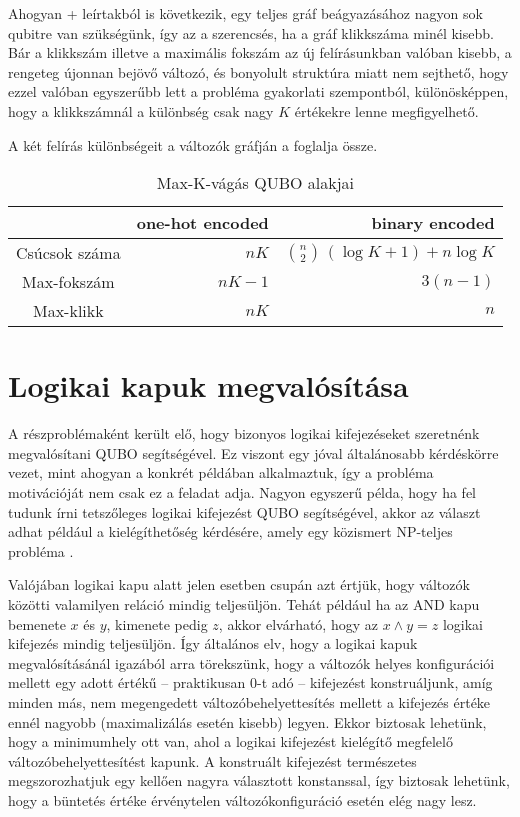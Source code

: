 Ahogyan \az+ leírtakból is következik, egy teljes gráf beágyazásához nagyon sok qubitre van szükségünk, így az a szerencsés, ha a gráf klikkszáma minél kisebb. Bár a klikkszám illetve a maximális fokszám az új felírásunkban valóban kisebb, a rengeteg újonnan bejövő változó, és bonyolult struktúra miatt nem sejthető, hogy ezzel valóban egyszerűbb lett a probléma gyakorlati szempontból, különösképpen, hogy a klikkszámnál a különbség csak nagy $K$ értékekre lenne megfigyelhető.

A két felírás különbségeit a változók gráfján a  foglalja össze.


\begin{table}[ht]
	\footnotesize
	\centering
	\begin{tabular}{ c r r }
		\toprule
		  & one-hot encoded & binary encoded \\
		\midrule
		Csúcsok száma  & $n K$     & $\binom{n}{2} \, ( \log K + 1 ) + n \log K$ \\
		Max-fokszám    & $n K - 1 $ & $3(n-1)$ \\
		Max-klikk      & $n K$     & $n$ \\		
		\bottomrule
	\end{tabular}
	\caption{Max-K-vágás QUBO alakjai}
	\label{tab:diffMaxKCutFormulas}
\end{table}  

\section{Logikai kapuk megvalósítása}\label{sec:theoryLogicalGates}

A  részproblémaként került elő, hogy bizonyos logikai kifejezéseket szeretnénk megvalósítani QUBO segítségével. Ez viszont egy jóval általánosabb kérdéskörre vezet, mint ahogyan a konkrét példában alkalmaztuk, így a probléma motivációját nem csak ez a feladat adja. Nagyon egyszerű példa, hogy ha fel tudunk írni tetszőleges logikai kifejezést QUBO segítségével, akkor az választ adhat például a kielégíthetőség kérdésére, amely egy közismert NP-teljes probléma \cite{algoritmusokBook}.

Valójában logikai kapu alatt jelen esetben csupán azt értjük, hogy változók közötti valamilyen reláció mindig teljesüljön. Tehát például ha az AND kapu bemenete $x$ és $y$, kimenete pedig $z$, akkor elvárható, hogy az $x \wedge y = z$ logikai kifejezés mindig teljesüljön. Így általános elv, hogy a logikai kapuk megvalósításánál igazából arra törekszünk, hogy a változók helyes konfigurációi mellett egy adott értékű -- praktikusan 0-t adó -- kifejezést konstruáljunk, amíg minden más, nem megengedett változóbehelyettesítés mellett a kifejezés értéke ennél nagyobb (maximalizálás esetén kisebb) legyen. Ekkor biztosak lehetünk, hogy a minimumhely ott van, ahol a logikai kifejezést kielégítő megfelelő változóbehelyettesítést kapunk. A konstruált kifejezést természetes megszorozhatjuk egy kellően nagyra választott konstanssal, így biztosak lehetünk, hogy a büntetés értéke érvénytelen változókonfiguráció esetén elég nagy lesz.

